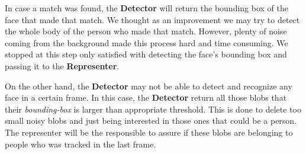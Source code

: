 In case a match was found, the \textbf{Detector} will return the bounding box of the face that made that match. We thought as an improvement we may try to detect the whole body of the person who made that match. However, plenty of noise coming from the background made this process hard and time consuming. We stopped at this step only satisfied with detecting the face's bounding box and passing it to the \textbf{Representer}.

On the other hand, the \textbf{Detector} may not be able to detect and recognize any face in a certain frame. In this case, the \textbf{Detector} return all those blobs that their \textit{bounding-box} is larger than appropriate threshold. This is done to delete too small noisy blobs and just being interested in those ones that could be a person. The representer will be the responsible to assure if these blobs are belonging to people who was tracked in the last frame.
